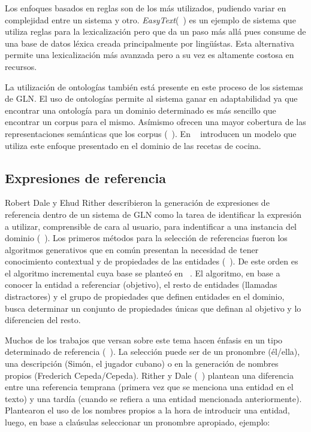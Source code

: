     Los enfoques basados en reglas son de los m\'as utilizados, pudiendo variar en complejidad entre un sistema y otro. \textit{EasyText}(~\cite{danlos2011easytext}) 
es un ejemplo de sistema que utiliza reglas para la lexicalización pero que da un paso m\'as all\'a pues consume de una base de datos 
l\'exica creada principalmente por lingüístas. Esta alternativa permite una lexicalización m\'as avanzada pero a su vez es altamente 
costosa en recursos.

    La utilizaci\'on de ontolog\'ias tambi\'en est\'a presente en este proceso de los sistemas de GLN. El uso de ontologías permite 
al sistema ganar en adaptabilidad ya que encontrar una ontología para un dominio determinado es más sencillo que encontrar un corpus para 
el mismo. Asímismo ofrecen una mayor cobertura de las representaciones semánticas que los corpus (~\cite{Perera2017RecentAI}). En ~\cite{cimiano2013exploiting} introducen 
un modelo que utiliza este enfoque presentado en el dominio de las recetas de cocina.


\subsection{Expresiones de referencia}\label{subsection:expreferencia}

    Robert Dale y Ehud Rither describieron la generación de expresiones de referencia dentro de un sistema de GLN como la tarea de 
identificar la expresión a utilizar, comprensible de cara al usuario, para indentificar a una instancia del dominio (~\cite{reiter_dale_2000,Gatt2018SurveyOT}). 
Los primeros m\'etodos para la selección de referencias fueron los algoritmos generativos que en común presentan la necesidad de tener conocimiento 
contextual y de propiedades de las entidades (~\cite{Gatt2018SurveyOT}). De este orden es el algoritmo incremental cuya base se plante\'o en ~\cite{dale1995computational}. 
El algoritmo, en base a conocer la entidad a referenciar (objetivo), el resto de entidades (llamadas distractores) y el grupo de propiedades que definen entidades en el dominio,
busca determinar un conjunto de propiedades \'unicas que definan al objetivo y lo diferencien del resto.

    Muchos de los trabajos que versan sobre este tema hacen énfasis en un tipo determinado de referencia (~\cite{ferreira2018neuralreg}). La selección 
puede ser de un pronombre (\'el/ella), una descripci\'on (Sim\'on, el jugador cubano) o en la generación de nombres propios (Frederich Cepeda/Cepeda). 
Rither y Dale (~\cite{reiter_dale_2000}) plantean una diferencia entre una referencia temprana (primera vez que se menciona una 
entidad en el texto) y una tard\'ia (cuando se refiera a una entidad mencionada anteriormente). Plantearon el uso de los nombres propios a la hora 
de introducir una entidad, luego, en base a cla\'usulas seleccionar un pronombre apropiado, ejemplo:

